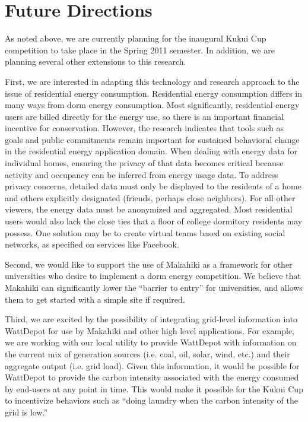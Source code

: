 
\section{Future Directions}
\label{sec:future-directions}

As noted above, we are currently planning for the inaugural Kukui Cup
competition to take place in the Spring 2011 semester.  In addition, we are
planning several other extensions to this research.

First, we are interested in adapting this technology and research approach
to the issue of residential energy consumption.  Residential energy
consumption differs in many ways from dorm energy consumption. Most
significantly, residential energy users are billed directly for the energy
use, so there is an important financial incentive for conservation.
However, the research indicates that tools such as goals and public
commitments remain important for sustained behavioral change in the residential
energy application domain. When dealing with energy data for individual homes,
ensuring the privacy of that data becomes critical because activity and
occupancy can be inferred from energy usage data. To address privacy concerns,
detailed data must only be displayed to the residents of a home and others
explicitly designated (friends, perhaps close neighbors). For all other viewers,
the energy data must be anonymized and aggregated. Most residential users would
also lack the close ties that a floor of college dormitory residents may
possess. One solution may be to create virtual teams based on existing social
networks, as specified on services like Facebook.

Second, we would like to support the use of Makahiki as a framework for
other universities who desire to implement a dorm energy competition.  We
believe that Makahiki can significantly lower the ``barrier to entry'' for
universities, and allows them to get started with a simple site if required. 

Third, we are excited by the possibility of integrating grid-level
information into WattDepot for use by Makahiki and other high level
applications.  For example, we are working with our local utility to
provide WattDepot with information on the current mix of generation sources
(i.e. coal, oil, solar, wind, etc.) and their aggregate output
(i.e. grid load).  Given this information, it would be possible for
WattDepot to provide the carbon intensity associated with the energy
consumed by end-users at any point in time.  This would make it possible
for the Kukui Cup to incentivize behaviors such as ``doing laundry when the
carbon intensity of the grid is low.''





